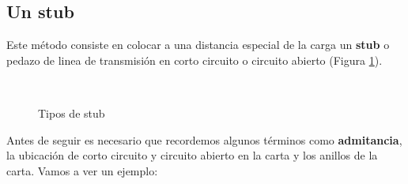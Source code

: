 \documentclass[
	12pt, %
	fleqn, %
	a4paper, %
	oneside, %
]{LegrandOrangeBook}
\begin{document}
\subsection*{Un stub}
Este método consiste en colocar a una distancia especial de la carga un \textbf{stub} o pedazo de linea de transmisión en corto circuito o circuito abierto (Figura \ref{fig:tipos de stub}).
\begin{figure}[]
\centering
{}
\\
\caption{Tipos de stub}
\label{fig:tipos de stub}
\end{figure}
Antes de seguir es necesario que recordemos algunos términos como \textbf{admitancia}, la ubicación de corto circuito y circuito abierto en la carta y los anillos de la carta. Vamos a ver un ejemplo:
\end{document}
